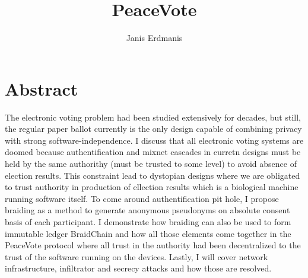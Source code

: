 \documentclass[12pt,a4paper]{article}
\title{PeaceVote}
\author{Janis Erdmanis}
\let\Oldsection\section
\renewcommand{\section}{\FloatBarrier\Oldsection}
\begin{document}
\maketitle


\section{Abstract}
The electronic voting problem had been studied extensively for decades, but still, the regular paper ballot currently is the only design capable of combining privacy with strong software-independence. I discuss that all electronic voting systems are doomed because authentification and mixnet cascades in curretn designs must be held by the same authorithy (must be trusted to some level) to avoid absence of election results. This constraint lead to dystopian designs where we are obligated to trust authority in production of ellection results which is a biological machine running software itself. To come around authentification pit hole, I propose braiding as a method to generate anonymous pseudonyms on absolute consent basis of each participant. I demonstrate how braiding can also be used to form immutable ledger BraidChain and how all those elements come together in the PeaceVote protocol where all trust in the authority had been decentralized to the trust of the software running on the devices. Lastly, I will cover network infrastructure, infiltrator and secrecy attacks and how those are resolved.\par
\end{document}

